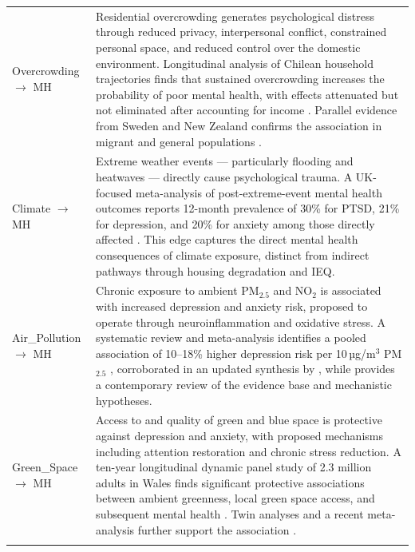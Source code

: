 \begin{longtable}{@{}p{3.5cm}p{11.5cm}@{}}
\addlinespace
Overcrowding $\to$ MH & Residential overcrowding generates psychological distress through reduced privacy, interpersonal conflict, constrained personal space, and reduced control over the domestic environment. Longitudinal analysis of Chilean household trajectories finds that sustained overcrowding increases the probability of poor mental health, with effects attenuated but not eliminated after accounting for income \citep{ruiz-tagle_household_2022}. Parallel evidence from Sweden and New Zealand confirms the association in migrant and general populations \citep{mangrio_crowded_2018, pierse_examining_2016}. \\
\addlinespace
Climate $\to$ MH & Extreme weather events — particularly flooding and heatwaves — directly cause psychological trauma. A UK-focused meta-analysis of post-extreme-event mental health outcomes reports 12-month prevalence of 30\% for PTSD, 21\% for depression, and 20\% for anxiety among those directly affected \citep{cruz_effect_2020}. This edge captures the direct mental health consequences of climate exposure, distinct from indirect pathways through housing degradation and IEQ. \\
\addlinespace
Air\_Pollution $\to$ MH & Chronic exposure to ambient PM$_{2.5}$ and NO$_2$ is associated with increased depression and anxiety risk, proposed to operate through neuroinflammation and oxidative stress. A systematic review and meta-analysis identifies a pooled association of 10--18\% higher depression risk per 10\,µg/m$^{3}$ PM$_{2.5}$ \citep{braithwaite_air_2019}, corroborated in an updated synthesis by \citet{borroni_air_2022}, while \citet{bhui_air_2023} provides a contemporary review of the evidence base and mechanistic hypotheses. \\
\addlinespace
Green\_Space $\to$ MH & Access to and quality of green and blue space is protective against depression and anxiety, with proposed mechanisms including attention restoration and chronic stress reduction. A ten-year longitudinal dynamic panel study of 2.3 million adults in Wales finds significant protective associations between ambient greenness, local green space access, and subsequent mental health \citep{sheridan_mayall_ambient_2024}. Twin analyses and a recent meta-analysis further support the association \citep{cohen-cline_access_2015, liu_green_2023, kruize_urban_2019}. \\
\addlinespace

\end{longtable}
